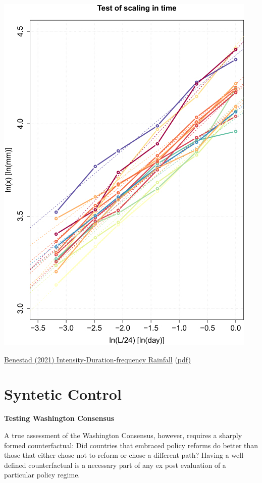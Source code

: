 \documentclass[
]{book}
\begin{document}
\includegraphics{fig/Benestad_Timescaling.jpg}

\href{https://iopscience.iop.org/article/10.1088/1748-9326/abd4ab}{Benestad (2021) Intensity-Duration-frequency Rainfall}
\href{pdf/Benestad_2021_Intensity_Duration_Frequency.pdf}{(pdf)}

\hypertarget{syntetic-control}{%
\chapter{Syntetic Control}\label{syntetic-control}}

\textbf{Testing Washington Consensus}

A true assessment of the Washington Consensus, however, requires a sharply formed counterfactual: Did countries that embraced policy reforms do better than those that either chose not to reform or chose a different path? Having a well-defined counterfactual is a necessary part of any ex post evaluation of a particular policy regime.
\end{document}
